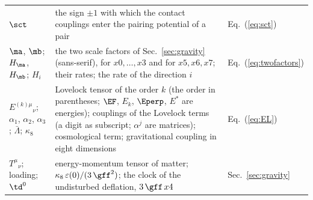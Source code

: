 \begin{table}
\begin{ruledtabular}
\begin{tabular}{p{}p{}p{}}
$\sct$ & the sign $\pm1$ with which the contact couplings enter the pairing potential of a pair & Eq.~(\ref{eq:sct}) \\
$\ma$, $\mb$; $H_{\ma}$, $H_{\mb}$; $H_i$ & the two scale factors of Sec.~\ref{sec:gravity} (sans-serif), for $x0,\dots,x3$ and for $x5,x6,x7$; their rates; the rate of the direction $i$ & Eq.~(\ref{eq:twofactors}) \\
$E^{(k)\mu}{}_{\nu}$; $\alpha_1$, $\alpha_2$, $\alpha_3$; $\bar\Lambda$; $\kappa_8$ & Lovelock tensor of the order $k$ (the order in parentheses; $\EF$, $E_k$, $\Eperp$, $E^{*}$ are energies); couplings of the Lovelock terms (a digit as subscript; $\alpha^{j}$ are matrices); cosmological term; gravitational coupling in eight dimensions & Eq.~(\ref{eq:EL}) \\
$T^{\mu}{}_{\nu}$; loading; $\td^{0}$ & energy-momentum tensor of matter; $\kappa_8\,\varepsilon(0)/(3\,\gff^{2})$; the clock of the undisturbed deflation, $3\,\gff\,x4$ & Sec.~\ref{sec:gravity} \\
\end{tabular}
\end{ruledtabular}
\end{table}

